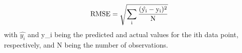 $$\rm{RMSE}=\sqrt{\sum\limits_{i}\frac{(\hat{y_i}-y_i)^2}{N}}$$
with $\hat{y_i}$ and y_i being the predicted and actual values for the ith data point, respectively, and N being the number of observations.